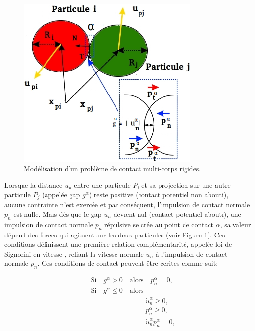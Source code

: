 \begin{figure}[!h]
  \centering
    \includegraphics[width=0.8\textwidth]{chapitres/chapitre_3/figures/contact_Pi_Pj.png}
    \caption{Modélisation d'un problème de contact multi-corps rigides.}\label{fig32}
\end{figure}

Lorsque la distance $u_n$ entre une particule $P_i$ et sa projection sur une autre particule $P_j$ (appelée gap $g^{\alpha}$) reste positive (contact potentiel non abouti), aucune contrainte n'est exercée et par conséquent, l'impulsion de contact normale $p_n$ est nulle. Mais dès que le gap $u_n$ devient nul (contact potentiel abouti), une impulsion de contact normale $p_n$ répulsive se crée au point de contact $\alpha$, sa valeur dépend des forces qui agissent sur les deux particules (voir Figure \ref{fig32}). Ces conditions définissent une première relation complémentarité, appelée loi de Signorini en vitesse \cite{signorini1933sopra}, reliant la vitesse normale $\dot{u}_n$ à l'impulsion de contact normale $p_n$. Ces conditions de contact peuvent être écrites comme suit:


\begin{eqnarray}
&&\label{undc0} \mbox{Si} \quad g^{\alpha} > 0 \quad \mbox{alors} \quad p^{\alpha}_n = 0,\\[2mm]
&&\nonumber \mbox{Si} \quad g^{\alpha} \leq 0 \quad \mbox{alors} \\[2mm]
&&\label{undc1} \qquad \qquad \qquad \qquad\dot{u}^{\alpha}_n \ge 0,\\[2mm]
&&\label{undc2} \qquad \qquad \qquad  \qquad p^{\alpha}_n \ge 0,\\[2mm]
&&\label{perstce} \qquad \qquad \qquad  \qquad\dot{u}^{\alpha}_n p^{\alpha}_n = 0,
\end{eqnarray}

